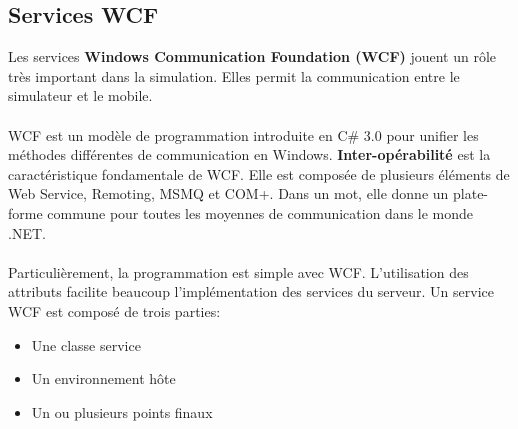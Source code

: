 \documentclass{article}
\begin{document}
\vspace{0.2 cm}
\subsection{\Large Services WCF}
Les services \textbf{Windows Communication Foundation (WCF)} jouent un rôle très important dans la simulation. Elles permit la communication entre le simulateur et le mobile. 
\\\\
WCF est un modèle de programmation introduite en C\# 3.0 pour unifier les méthodes différentes de communication en Windows. \textbf{Inter-opérabilité} est la caractéristique fondamentale de WCF. Elle est composée de plusieurs éléments de Web Service, Remoting, MSMQ et COM+. Dans un mot, elle donne un plate-forme commune pour toutes les moyennes de communication dans le monde .NET. 
\\\\
Particulièrement, la programmation est simple avec WCF. L'utilisation des attributs facilite beaucoup l'implémentation des services du serveur. Un service WCF est composé de trois parties: 
\begin{itemize}
\item Une classe service
\item Un environnement hôte
\item Un ou plusieurs points finaux
\end{itemize}

\vspace{0.2 cm}
\end{document}
